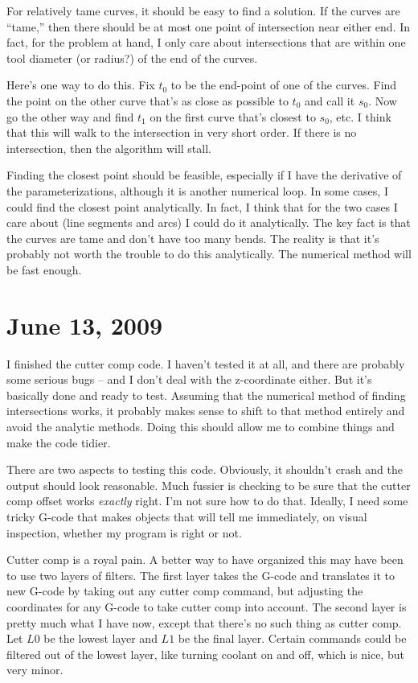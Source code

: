\documentclass[titlepage,oneside,10pt]{article}
\begin{document}
For relatively tame curves, it should be easy to find a solution. If
the curves are ``tame,'' then there should be at most one point of
intersection near either end. In fact, for the problem at hand, I only
care about intersections that are within one tool diameter (or
radius?) of the end of the curves. 

Here's one way to do this. Fix $t_0$ to be the end-point of one of the
curves. Find the point on the other curve that's as close as possible
to $t_0$ and call it $s_0$. Now go the other way and find $t_1$ on the
first curve that's closest to $s_0$, etc. I think that this will walk
to the intersection in very short order. If there is no intersection,
then the algorithm will stall. 

Finding the closest point should be feasible, especially if I have the
derivative of the parameterizations, although it is another numerical
loop. In some cases, I could find the closest point analytically. In
fact, I think that for the two cases I care about (line segments and
arcs) I could do it analytically. The key fact is that the curves are
tame and don't have too many bends. The reality is that it's
probably not worth the trouble to do this analytically. The numerical
method will be fast enough.

\section{June 13, 2009}

I finished the cutter comp code. I haven't tested it at all, and there
are probably some serious bugs -- and I don't deal with the
z-coordinate either. But it's basically done and ready to
test. Assuming that the numerical method of finding intersections
works, it probably makes sense to shift to that method entirely and
avoid the analytic methods. Doing this should allow me to combine things
and make the code tidier.

There are two aspects to testing this code. Obviously, it shouldn't
crash and the output should look reasonable. Much fussier is checking
to be sure that the cutter comp offset works \emph{exactly} right. I'm
not sure how to do that. Ideally, I need some tricky G-code that makes
objects that will tell me immediately, on visual inspection, whether
my program is right or not.

Cutter comp is a royal pain. A better way to have organized this may
have been to use two layers of filters. The first layer takes the
G-code and translates it to new G-code by taking out any cutter comp
command, but adjusting the coordinates for any G-code to take cutter
comp into account. The second layer is pretty much what I have now,
except that there's no such thing as cutter comp. Let $L0$ be the
lowest layer and $L1$ be the final layer. Certain commands could be
filtered out of the lowest layer, like turning coolant on and off,
which is nice, but very minor. 
\end{document}
